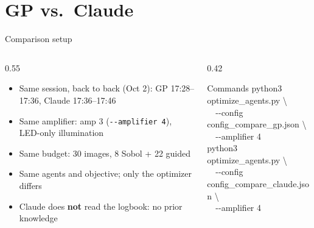 \documentclass[aspectratio=169,10pt]{beamer}
\begin{document}
\section{GP vs.\ Claude}

\begin{frame}{Comparison setup}
  \begin{columns}[T]
    \begin{column}{0.55\textwidth}
      \begin{itemize}
        \item Same session, back to back (Oct 2): GP 17:28--17:36, Claude 17:36--17:46
        \item Same amplifier: amp 3 (\texttt{-{}-amplifier 4}), LED-only illumination
        \item Same budget: 30 images, 8 Sobol + 22 guided
        \item Same agents and objective; only the optimizer differs
        \item Claude does \textbf{not} read the logbook: no prior knowledge
      \end{itemize}
    \end{column}
    \begin{column}{0.42\textwidth}
      \begin{block}{Commands}
        \scriptsize\ttfamily python3 optimize\_agents.py \textbackslash\\
        \ \ -{}-config config\_compare\_gp.json \textbackslash\\
        \ \ -{}-amplifier 4\\[1mm]
        python3 optimize\_agents.py \textbackslash\\
        \ \ -{}-config config\_compare\_claude.json \textbackslash\\
        \ \ -{}-amplifier 4
      \end{block}
    \end{column}
  \end{columns}
\end{frame}
\end{document}
